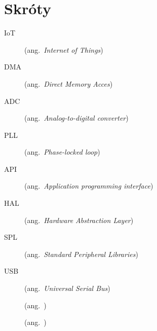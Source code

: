 \chapter*{Skróty}\mbox{}
\label{sec:skroty}
\noindent
\begin{description}
	\item [IoT] (ang.\ \emph{Internet of Things})
	\item [DMA] (ang.\ \emph{Direct Memory Acces})
	\item [ADC] (ang.\ \emph{Analog-to-digital converter})
	\item [PLL] (ang.\ \emph{Phase-locked loop})
	\item [API] (ang.\ \emph{Application programming interface})
	\item [HAL] (ang.\ \emph{Hardware Abstraction Layer})
	\item [SPL] (ang.\ \emph{Standard Peripheral Libraries})
	\item [USB] (ang.\ \emph{Universal Serial Bus})
	\item [] (ang.\ \emph{})
	\item [] (ang.\ \emph{})
\end{description}
